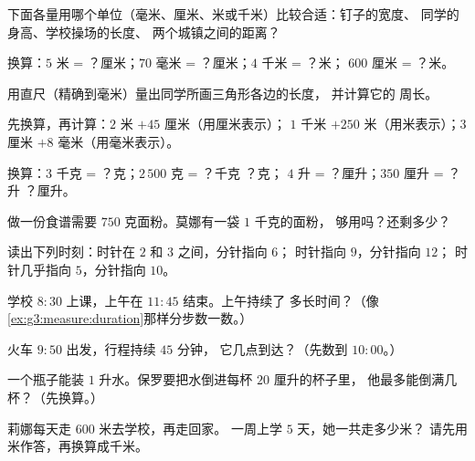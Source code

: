 \begin{exercise}[$\star$]\label{exo:g3:measure:1}
下面各量用哪个单位（毫米、厘米、米或千米）比较合适：钉子的宽度、
同学的身高、学校操场的长度、
两个城镇之间的距离？
\end{exercise}

\begin{exercise}[$\star$]\label{exo:g3:measure:2}
换算：$5$ 米 = ？厘米；\quad $70$ 毫米 = ？厘米；\quad $4$ 千米 = ？米；
\quad $600$ 厘米 = ？米。
\end{exercise}

\begin{exercise}[$\star$]\label{exo:g3:measure:3}
用直尺（精确到毫米）量出同学所画三角形各边的长度，
并计算它的
周长。
\end{exercise}

\begin{exercise}[$\star$]\label{exo:g3:measure:4}
先换算，再计算：$2$ 米 $+ 45$ 厘米（用厘米表示）；\quad
$1$ 千米 $+ 250$ 米（用米表示）；\quad $3$ 厘米 $+ 8$ 毫米（用毫米表示）。
\end{exercise}

\begin{exercise}[$\star$]\label{exo:g3:measure:5}
换算：$3$ 千克 = ？克；\quad $2\,500$ 克 = ？千克 ？克；\quad
$4$ 升 = ？厘升；\quad $350$ 厘升 = ？升 ？厘升。
\end{exercise}

\begin{exercise}[$\star$]\label{exo:g3:measure:6}
做一份食谱需要 $750$ 克面粉。莫娜有一袋 $1$ 千克的面粉，
够用吗？还剩多少？
\end{exercise}

\begin{exercise}[$\star$]\label{exo:g3:measure:7}
读出下列时刻：时针在 $2$ 和 $3$ 之间，分针指向 $6$；
时针指向 $9$，分针指向 $12$；
时针几乎指向 $5$，分针指向 $10$。
\end{exercise}

\begin{exercise}[$\star$]\label{exo:g3:measure:8}
学校 $8{:}30$ 上课，上午在 $11{:}45$ 结束。上午持续了
多长时间？（像
\cref{ex:g3:measure:duration}那样分步数一数。）
\end{exercise}

\begin{exercise}[$\star$]\label{exo:g3:measure:9}
火车 $9{:}50$ 出发，行程持续 $45$ 分钟，
它几点到达？（先数到 $10{:}00$。）
\end{exercise}

\begin{exercise}[$\star\star$]\label{exo:g3:measure:10}
一个瓶子能装 $1$ 升水。保罗要把水倒进每杯 $20$ 厘升的杯子里，
他最多能倒满几杯？（先换算。）
\end{exercise}

\begin{exercise}[$\star\star$]\label{exo:g3:measure:11}
莉娜每天走 $600$ 米去学校，再走回家。
一周上学 $5$ 天，她一共走多少米？
请先用米作答，再换算成千米。
\end{exercise}
